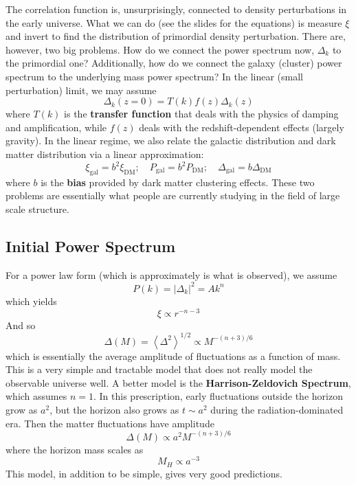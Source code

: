 \documentclass[10pt]{article}
\numberwithin{equation}{section}
\newcommand{\norm}[1]{\left\lvert#1\right\rvert}
\newcommand{\avg}[1]{\left\langle#1\right\rangle}
\begin{document}
		The correlation function is, unsurprisingly, connected to density perturbations in the early universe. What we can do (see the slides for the equations) is measure $\xi$ and invert to find the distribution of primordial density perturbation. There are, however, two big problems. How do we connect the power spectrum now, $\Delta_k$ to the primordial one? Additionally, how do we connect the galaxy (cluster) power spectrum to the underlying mass power spectrum? In the linear (small perturbation) limit, we may assume
		\begin{equation}
			\label{eq:large:5} \Delta_k(z=0) = T(k) f(z) \Delta_k(z)
		\end{equation}
		where $T(k)$ is the \textbf{transfer function} that deals with the physics of damping and amplification, while $f(z)$ deals with the redshift-dependent effects (largely gravity). In the linear regime, we also relate the galactic distribution and dark matter distribution via a linear approximation:
		\begin{equation}
			\label{eq:large:6} \xi_{\mathrm{gal}} = b^2\xi_{\mathrm{DM}};\quad P_{\mathrm{gal}} = b^2P_{\mathrm{DM}};\quad \Delta_{\mathrm{gal}} = b\Delta_{\mathrm{DM}}
		\end{equation}
		where $b$ is the \textbf{bias} provided by dark matter clustering effects. These two problems are essentially what people are currently studying in the field of large scale structure.
	\subsection{Initial Power Spectrum} %
	\label{sub:initial_power_spectrum}
		For a power law form (which is approximately is what is observed), we assume
		\begin{equation}
			\label{eq:large:7} P(k) = \norm{\Delta_k}^2 = A k^n
		\end{equation}
		which yields
		\begin{equation}
			\label{eq:large:8} \xi\propto r^{-n-3}
		\end{equation}
		And so
		\begin{equation}
			\label{eq:large:9} \Delta(M) = \avg{\Delta^2}^{1/2} \propto M^{-(n+3)/6}
		\end{equation}
		which is essentially the average amplitude of fluctuations as a function of mass. This is a very simple and tractable model that does not really model the observable universe well. A better model is the \textbf{Harrison-Zeldovich Spectrum}, which assumes $n=1$. In this prescription, early fluctuations outside the horizon grow as $a^2$, but the horizon also grows as $t\sim a^2$ during the radiation-dominated era.  Then the matter fluctuations have amplitude
		\begin{equation}
			\label{eq:large:10} \Delta(M) \propto a^2 M^{-(n+3)/6}
		\end{equation}
		where the horizon mass scales as
		\begin{equation}
			\label{eq:large:11} M_H\propto a^{-3}
		\end{equation}
		This model, in addition to be simple, gives very good predictions.\\
		
\end{document}
